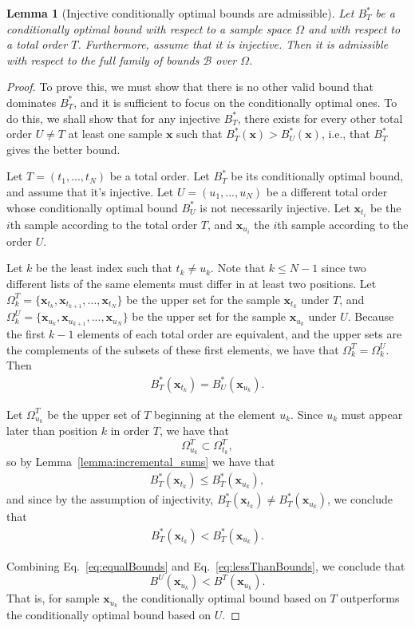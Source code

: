 \documentclass{article}
\newtheorem{lemma}[theorem]{Lemma}
\theoremstyle{definition}
\theoremstyle{remark}
\newcounter{assumption}%
\def\x{\mathbf{x}}
\begin{document}
\begin{lemma}[Injective conditionally optimal bounds are admissible]
\label{lem:injective_optimal_bounds}
 Let $B^*_T$ be a conditionally optimal bound with respect to a sample space $\Omega$ and with respect to a total order $T$. Furthermore, assume that it is injective. Then it is admissible with respect to the full family of bounds $\mathcal{B}$ over $\Omega$.
\end{lemma}
\begin{proof}
 To prove this, we must show that there is no other valid bound that dominates $B^*_T$, and it is sufficient to focus on the conditionally optimal ones. To do this, we shall show that for any injective $B^*_T$, there  exists for every other total order $U\neq T$ at least one sample $\x$ such that $B^*_T(\x)>B^*_U(\x)$, i.e., that $B^*_T$ gives the better bound. 

 Let $T=(t_1,...,t_N)$ be a total order. Let $B^*_T$ be its conditionally optimal bound, and assume that it's injective. Let $U=(u_1,...,u_N)$ be a different total order whose conditionally optimal bound $B^*_U$ is not necessarily injective.
Let $\x_{t_i}$ be the  $i$th sample according to the total order $T$, and  $\x_{u_i}$ the $i$th sample according to the order $U$. 

 Let $k$ be the least index such that $t_k\neq u_k$. Note that $k\leq N-1$ since two different lists of the same elements must differ in at least two positions. Let $\Omega^T_k=\{\x_{t_k},\x_{t_{k+1}},...,\x_{t_N}\}$ be the upper set for the sample $\x_{t_k}$ under $T$, and  $\Omega^U_k=\{\x_{u_k},\x_{u_{k+1}},...,\x_{u_N}\}$ be the upper set for the sample $\x_{u_k}$ under $U$. Because the first $k-1$ elements of each total order are equivalent, and the upper sets are the complements of the subsets of these first elements, 
 we have that $\Omega^T_k = \Omega^U_k$. Then 
 \begin{eqnarray}
 \label{eq:equalBounds}
B^*_T(\x_{t_k})=B^*_U(\x_{u_k}).
 \end{eqnarray}
 
 Let $\Omega^T_{u_k}$ be the upper set of $T$ beginning at the element $u_k$. Since $u_k$ must appear later than position $k$ in order $T$, we have that
 $$
 \Omega^T_{u_k} \subset \Omega^T_{t_k},
 $$
 so by Lemma~\ref{lemma:incremental_sums} we have that
 \begin{eqnarray*}
B^*_T(\x_{t_k}) \leq B^*_T(\x_{u_k}),
 \end{eqnarray*}
 and since by the assumption of injectivity,  $B^*_T(\x_{t_k}) \neq B^*_T(\x_{u_k})$, we conclude that
\begin{eqnarray}
\label{eq:lessThanBounds}
B^*_T(\x_{t_k}) < B^*_T(\x_{u_k}).
\end{eqnarray}
 
 Combining  Eq.~\ref{eq:equalBounds} and Eq.~\ref{eq:lessThanBounds}, we conclude that 
 $$
 B^U(\x_{u_k}) < B^T(\x_{u_k}). 
 $$
 That is, for sample $\x_{u_k}$ the conditionally optimal bound based on $T$ outperforms the conditionally optimal bound based on $U$.
 \end{proof}
\end{document}
